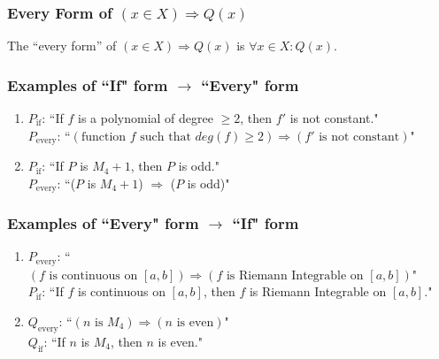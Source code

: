 \documentclass{article}
\begin{document}
\subsubsection{Every Form of $(x \in X) \Rightarrow Q(x)$}

The ``every form'' of $(x \in X) \Rightarrow Q(x)$ is $\forall x \in X \colon Q(x)$.

\subsubsection{Examples of ``If" form $\rightarrow$ ``Every" form}

\begin{enumerate}
    \item $P_{\text{if}}$: ``If $f$ is a polynomial of degree $\ge 2$, then $f'$ is not constant." \\
    $P_{\text{every}}$: ``$(\text{function } f \text{ such that } deg(f) \ge 2) \Rightarrow (f' \text{ is not constant})$"

    \item $P_{\text{if}}$: ``If $P$ is $M_4+1$, then $P$ is odd." \\
    $P_{\text{every}}$: ``($P$ is $M_4+1$) $\Rightarrow$ ($P$ is odd)"
\end{enumerate}

\subsubsection{Examples of ``Every" form $\rightarrow$ ``If" form}

\begin{enumerate}
    \item $P_{\text{every}}$: ``$(f \text{ is continuous on } [a, b]) \Rightarrow (f \text{ is Riemann Integrable on } [a, b])$" \\
    $P_{\text{if}}$: ``If $f$ is continuous on $[a, b]$, then $f$ is Riemann Integrable on $[a, b].$"

    \item $Q_{\text{every}}$: ``$(n \text{ is } M_4) \Rightarrow (n \text{ is even})$" \\
    $Q_{\text{if}}$: ``If $n$ is $M_4$, then $n$ is even."
\end{enumerate}
\end{document}
